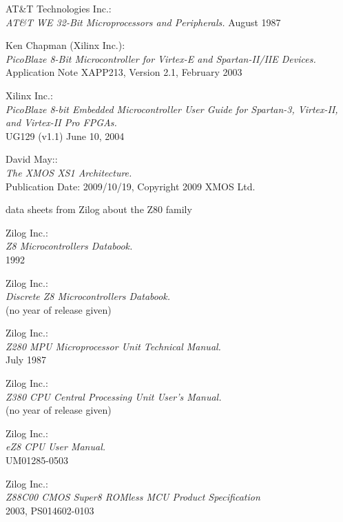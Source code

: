  AT\&T Technologies Inc.: \\
            {\em AT\&T WE 32-Bit Microprocessors and Peripherals.\/}
            August 1987

 Ken Chapman (Xilinx Inc.):\\
                 {\em PicoBlaze 8-Bit Microcontroller for Virtex-E
                 and Spartan-II/IIE Devices.\/} \\
                 Application Note XAPP213, Version 2.1, February 2003

 Xilinx Inc.: \\
                 {\em PicoBlaze 8-bit Embedded Microcontroller User Guide
                 for Spartan-3, Virtex-II, and Virtex-II Pro FPGAs.\/} \\
                 UG129 (v1.1) June 10, 2004
                          
 David May:: \\
               {\em The XMOS XS1 Architecture.\/} \\
               Publication Date: 2009/10/19, Copyright 2009 XMOS Ltd.

 data sheets from Zilog about the Z80 family

 Zilog Inc.: \\
                {\em Z8 Microcontrollers Databook.\/} \\
                1992

 Zilog Inc.: \\
                  {\em Discrete Z8 Microcontrollers Databook.\/} \\
                  (no year of release given)

 Zilog Inc.: \\
                  {\em Z280 MPU Microprocessor Unit Technical Manual.\/} \\
                  July 1987

 Zilog Inc.: \\
                  {\em Z380 CPU Central Processing Unit User's
                  Manual.\/} \\
                  (no year of release given)

 Zilog Inc.: \\
               {\em eZ8 CPU User Manual.\/} \\
               UM01285-0503

 Zilog Inc.: \\
               {\em Z88C00 CMOS Super8 ROMless MCU Product Specification\/} \\
               2003, PS014602-0103

